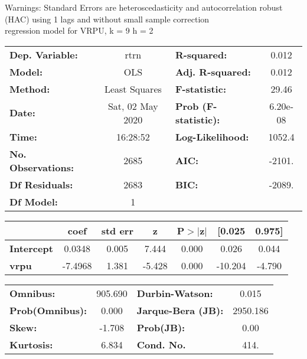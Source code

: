 Warnings: \newline
 [1] Standard Errors are heteroscedasticity and autocorrelation robust (HAC) using 1 lags and without small sample correction\\ 

regression model for VRPU, k = 9 h = 2\begin{center}
\begin{tabular}{lclc}
\toprule
\textbf{Dep. Variable:}    &       rtrn       & \textbf{  R-squared:         } &     0.012   \\
\textbf{Model:}            &       OLS        & \textbf{  Adj. R-squared:    } &     0.012   \\
\textbf{Method:}           &  Least Squares   & \textbf{  F-statistic:       } &     29.46   \\
\textbf{Date:}             & Sat, 02 May 2020 & \textbf{  Prob (F-statistic):} &  6.20e-08   \\
\textbf{Time:}             &     16:28:52     & \textbf{  Log-Likelihood:    } &    1052.4   \\
\textbf{No. Observations:} &        2685      & \textbf{  AIC:               } &    -2101.   \\
\textbf{Df Residuals:}     &        2683      & \textbf{  BIC:               } &    -2089.   \\
\textbf{Df Model:}         &           1      & \textbf{                     } &             \\
\bottomrule
\end{tabular}
\begin{tabular}{lcccccc}
                   & \textbf{coef} & \textbf{std err} & \textbf{z} & \textbf{P$> |$z$|$} & \textbf{[0.025} & \textbf{0.975]}  \\
\midrule
\textbf{Intercept} &       0.0348  &        0.005     &     7.444  &         0.000        &        0.026    &        0.044     \\
\textbf{vrpu}      &      -7.4968  &        1.381     &    -5.428  &         0.000        &      -10.204    &       -4.790     \\
\bottomrule
\end{tabular}
\begin{tabular}{lclc}
\textbf{Omnibus:}       & 905.690 & \textbf{  Durbin-Watson:     } &    0.015  \\
\textbf{Prob(Omnibus):} &   0.000 & \textbf{  Jarque-Bera (JB):  } & 2950.186  \\
\textbf{Skew:}          &  -1.708 & \textbf{  Prob(JB):          } &     0.00  \\
\textbf{Kurtosis:}      &   6.834 & \textbf{  Cond. No.          } &     414.  \\
\bottomrule
\end{tabular}
\end{center}

